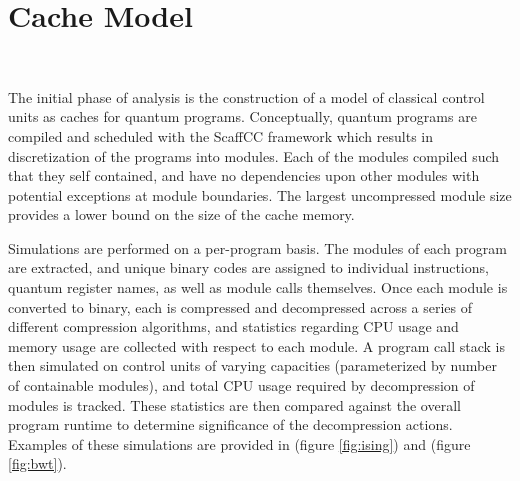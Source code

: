 \section*{Cache Model}~\par
	The initial phase of analysis is the construction of a model of classical control units as caches for quantum programs. Conceptually, quantum programs are compiled and scheduled with the ScaffCC framework which results in discretization of the programs into modules. Each of the modules compiled such that they self contained, and have no dependencies upon other modules with potential exceptions at module boundaries. The largest uncompressed module size provides a lower bound on the size of the cache memory.\par
	Simulations are performed on a per-program basis. The modules of each program are extracted, and unique binary codes are assigned to individual instructions, quantum register names, as well as module calls themselves. Once each module is converted to binary, each is compressed and decompressed across a series of different compression algorithms, and statistics regarding CPU usage and memory usage are collected with respect to each module. A program call stack is then simulated on control units of varying capacities (parameterized by number of containable modules), and total CPU usage required by decompression of modules is tracked. These statistics are then compared against the overall program runtime to determine significance of the decompression actions. Examples of these simulations are provided in (figure \ref{fig:ising}) and (figure \ref{fig:bwt}).\par 
	
